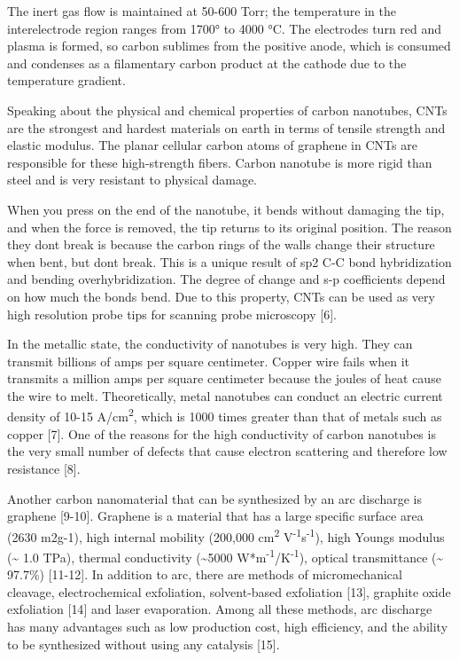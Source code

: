 The inert gas flow is maintained at 50-600 Torr; the temperature in the
interelectrode region ranges from 1700° to 4000 °C. The electrodes turn
red and plasma is formed, so carbon sublimes from the positive anode,
which is consumed and condenses as a filamentary carbon product at the
cathode due to the temperature gradient.

Speaking about the physical and chemical properties of carbon nanotubes,
CNTs are the strongest and hardest materials on earth in terms of
tensile strength and elastic modulus. The planar cellular carbon atoms
of graphene in CNTs are responsible for these high-strength fibers.
Carbon nanotube is more rigid than steel and is very resistant to
physical damage.

When you press on the end of the nanotube, it bends without damaging the
tip, and when the force is removed, the tip returns to its original
position. The reason they don\textquotesingle t break is because the
carbon rings of the walls change their structure when bent, but
don\textquotesingle t break. This is a unique result of sp2 C-C bond
hybridization and bending overhybridization. The degree of change and
s-p coefficients depend on how much the bonds bend. Due to this
property, CNTs can be used as very high resolution probe tips for
scanning probe microscopy {[}6{]}.

In the metallic state, the conductivity of nanotubes is very high. They
can transmit billions of amps per square centimeter. Copper wire fails
when it transmits a million amps per square centimeter because the
joules of heat cause the wire to melt. Theoretically, metal nanotubes
can conduct an electric current density of 10-15
A/cm\textsuperscript{2}, which is 1000 times greater than that of metals
such as copper {[}7{]}. One of the reasons for the high conductivity of
carbon nanotubes is the very small number of defects that cause electron
scattering and therefore low resistance {[}8{]}.

Another carbon nanomaterial that can be synthesized by an arc discharge
is graphene {[}9-10{]}. Graphene is a material that has a large specific
surface area (2630 m2g-1), high internal mobility (200,000
cm\textsuperscript{2} V\textsuperscript{-1}s\textsuperscript{-1}), high
Young\textquotesingle s modulus (\textasciitilde{} 1.0 TPa), thermal
conductivity (\textasciitilde5000
W*m\textsuperscript{-1}/K\textsuperscript{-1}), optical transmittance
(\textasciitilde{} 97.7\%) {[}11-12{]}. In addition to arc, there are
methods of micromechanical cleavage, electrochemical exfoliation,
solvent-based exfoliation {[}13{]}, graphite oxide exfoliation {[}14{]}
and laser evaporation. Among all these methods, arc discharge has many
advantages such as low production cost, high efficiency, and the ability
to be synthesized without using any catalysis {[}15{]}.

